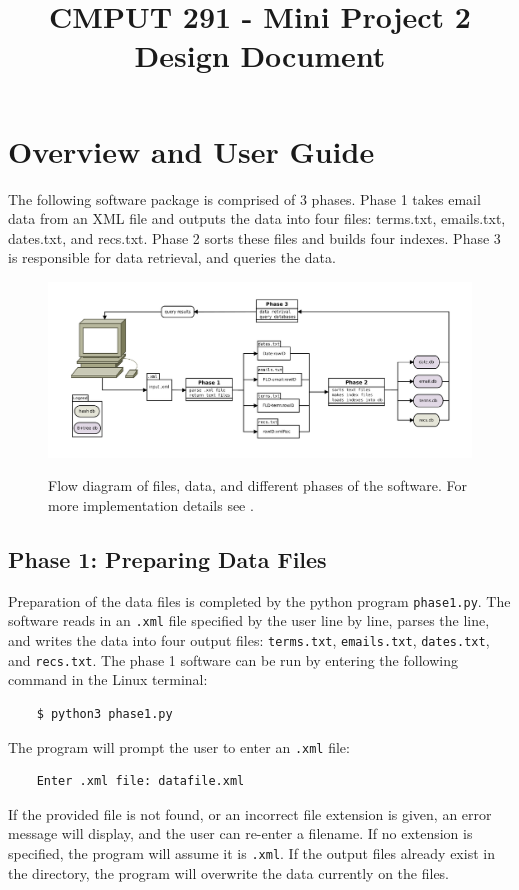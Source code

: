 \documentclass[11pt, a4paper]{article}
\begin{document}
{\selectfont

\title{\vspace{-20mm}CMPUT 291 - Mini Project 2 Design Document}
\date{}
\maketitle
\vspace{-20mm}

\section{Overview and User Guide}\label{OV}
The following software package is comprised of 3 phases. Phase 1 takes email data from an XML file and outputs the data into four files: terms.txt, emails.txt, dates.txt, and recs.txt. Phase 2 sorts these files and builds four indexes. Phase 3 is responsible for data retrieval, and queries the data.

\begin{figure}[H]
\centering
\includegraphics[width = \textwidth]{software_FD.pdf}\label{fig}
\caption{Flow diagram of files, data, and different phases of the software. For more implementation details see \emph{}.}
\end{figure}

\subsection{Phase 1: Preparing Data Files}
Preparation of the data files is completed by the python program \texttt{phase1.py}. The software reads in an \texttt{.xml} file specified by the user line by line, parses the line, and writes the data into four output files: \texttt{terms.txt}, \texttt{emails.txt}, \texttt{dates.txt}, and \texttt{recs.txt}. The phase 1 software can be run by entering the following command in the Linux terminal:
\begin{lstlisting}
    $ python3 phase1.py
\end{lstlisting}
The program will prompt the user to enter an \texttt{.xml} file:
\begin{lstlisting}
    Enter .xml file: datafile.xml
\end{lstlisting}
If the provided file is not found, or an incorrect file extension is given, an error message will display, and the user can re-enter a filename. If no extension is specified, the program will assume it is \texttt{.xml}. If the output files already exist in the directory, the program will overwrite the data currently on the files.

}
\end{document}

